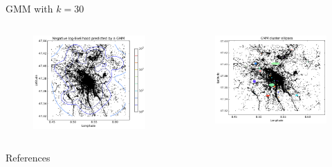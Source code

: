 \documentclass{beamer}
\begin{document}
\begin{frame}{GMM with $k = 30$}
  \begin{columns}
    \begin{column}{0.5\columnwidth}
      \begin{figure}
        \centering
        \includegraphics[width=\columnwidth]{gmm_nlog_likelihood_30}
      \end{figure}
    \end{column}
    \begin{column}{0.5\columnwidth}
      \begin{figure}
        \centering
        \includegraphics[width=\columnwidth]{gmm_clusters_30}
      \end{figure}
    \end{column}
  \end{columns}
\end{frame}

\begin{frame}{References}
  
  
\end{frame}
\end{document}
